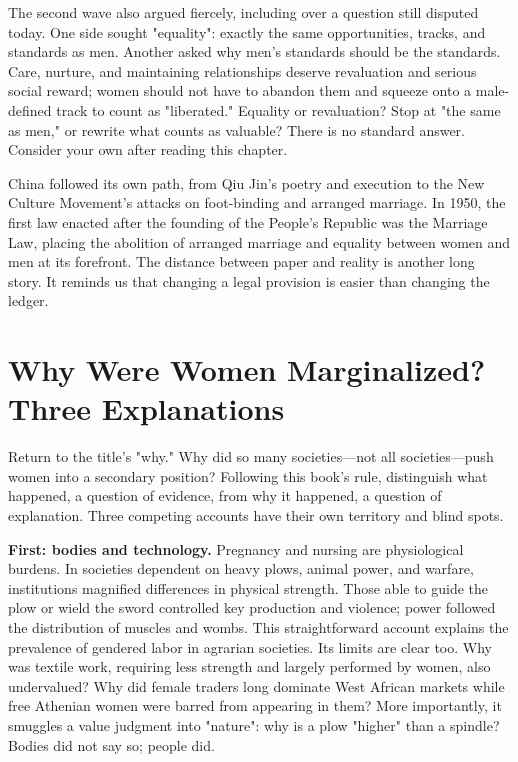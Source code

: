 The second wave also argued fiercely, including over a question still disputed today. One side sought "equality": exactly the same opportunities, tracks, and standards as men. Another asked why men's standards should be the standards. Care, nurture, and maintaining relationships deserve revaluation and serious social reward; women should not have to abandon them and squeeze onto a male-defined track to count as "liberated." Equality or revaluation? Stop at "the same as men," or rewrite what counts as valuable? There is no standard answer. Consider your own after reading this chapter.

China followed its own path, from Qiu Jin's poetry and execution to the New Culture Movement's attacks on foot-binding and arranged marriage. In 1950, the first law enacted after the founding of the People's Republic was the Marriage Law, placing the abolition of arranged marriage and equality between women and men at its forefront. The distance between paper and reality is another long story. It reminds us that changing a legal provision is easier than changing the ledger.

\section[Women's Marginalization: Three Accounts]{Why Were Women Marginalized? Three Explanations}
Return to the title's "why." Why did so many societies---not all societies---push women into a secondary position? Following this book's rule, distinguish what happened, a question of evidence, from why it happened, a question of explanation. Three competing accounts have their own territory and blind spots.

\textbf{First: bodies and technology.} Pregnancy and nursing are physiological burdens. In societies dependent on heavy plows, animal power, and warfare, institutions magnified differences in physical strength. Those able to guide the plow or wield the sword controlled key production and violence; power followed the distribution of muscles and wombs. This straightforward account explains the prevalence of gendered labor in agrarian societies. Its limits are clear too. Why was textile work, requiring less strength and largely performed by women, also undervalued? Why did female traders long dominate West African markets while free Athenian women were barred from appearing in them? More importantly, it smuggles a value judgment into "nature": why is a plow "higher" than a spindle? Bodies did not say so; people did.

